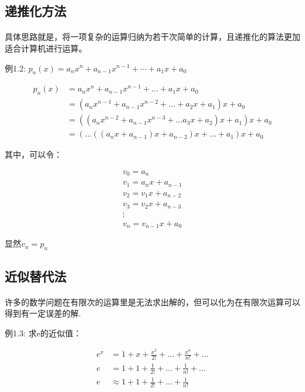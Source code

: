 \documentclass[12pt]{report}
\begin{document}
\subsection{递推化方法}

\paragraph{ } 具体思路就是，将一项复杂的运算归纳为若干次简单的计算，且递推化的算法更加适合计算机进行运算。

例1.2: \quad $p_n(x)=a_n x^n+a_{n-1} x^{n-1}+ \cdots +a_1 x+a_0$

\begin{align*}
	p_n(x) & =a_{n} x^{n}+a_{n-1} x^{n-1}+\ldots+a_{1} x+a_{0}                                              \\
	       & =\left(a_{n} x^{n-1}+a_{n-1} x^{n-2}+\ldots+a_{2} x+a_{1}\right) x+a_{0}                       \\
	       & =\left(\left(a_{n} x^{n-2}+a_{n-1} x^{n-3}+\ldots a_{3} x+a_{2}\right) x+a_{1}\right) x+a_{0}  \\
	       & =\left(\ldots\left(\left(a_{n} x+a_{n-1}\right) x+a_{n-2}\right) x+\ldots+a_{1}\right) x+a_{0}
\end{align*}

其中，可以令：

\[
	\begin{array}{l}
		v_{0}=a_{n}           \\
		v_{1}=a_{n} x+a_{n-1} \\
		v_{2}=v_{1} x+a_{n-2} \\
		v_{3}=v_{2} x+a_{n-3} \\
		\vdots                \\
		v_{n}=v_{n-1} x+a_{0}
	\end{array}
\]

显然$v_n=p_n$


\subsection{近似替代法}

\paragraph{ } 许多的数学问题在有限次的运算里是无法求出解的，但可以化为在有限次运算可以得到有一定误差的解.

例1.3: \quad 求e的近似值：

\begin{equation}
	\begin{aligned}
		e^x & = 1 + x + \frac{x^2}{2!} + \ldots + \frac{x^n}{n!} + \ldots \\
		e   & = 1 + 1 + \frac{1}{2!} + \ldots + \frac{1}{n!} + \ldots     \\
		e   & \approx 1 + 1 + \frac{1}{2!} + \ldots + \frac{1}{n!}
	\end{aligned}
\end{equation}
\end{document}
